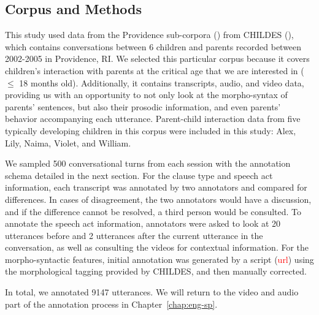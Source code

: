 \subsection{Corpus and Methods}
\label{sec:engcl:corpus:methods}
This study used data from the Providence sub-corpora (\cite{ProvidenceCorpus}) from CHILDES (\cite{CHILDES}), which contains conversations between 6 children and parents recorded between 2002-2005 in Providence, RI. We selected this particular corpus because it covers children’s interaction with parents at the critical age that we are interested in ($\leq$ 18 months old). Additionally, it contains transcripts, audio, and video data, providing us with an opportunity to not only look at the morpho-syntax of parents’ sentences, but also their prosodic information, and even parents’ behavior accompanying each utterance. Parent-child interaction data from five typically developing children in this corpus were included in this study: Alex, Lily, Naima, Violet, and William. %

We sampled 500 conversational turns from each session with the annotation schema detailed in the next section. For the clause type and speech act information, each transcript was annotated by two annotators and compared for differences. In cases of disagreement, the two annotators would have a discussion, and if the difference cannot be resolved, a third person would be consulted. To annotate the speech act information, annotators were asked to look at 20 utterances before and 2 utterances after the current utterance in the conversation, as well as consulting the videos for contextual information. For the morpho-syntactic features, initial annotation was generated by a script (\textcolor{red}{url}) using the morphological tagging provided by CHILDES, and then manually corrected. 

In total, we annotated 9147 utterances. We will return to the video and audio part of the annotation process in Chapter~\ref{chap:eng-sp}.




